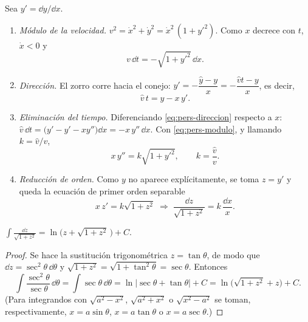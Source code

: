 \begin{desarrollo}
Sea $y'=\dd y/\dd x$.
\begin{enumerate}[label=\textbf{\arabic*.}, leftmargin=1.6em]
  \item \emph{Módulo de la velocidad.} $v^2=\dot x^2+\dot y^2=\dot x^2\,(1+y'^2)$. Como $x$ decrece con $t$, $\dot x<0$ y
  \begin{equation}
    v\,\dd t=-\sqrt{1+y'^2}\,\dd x .
    \label{eq:pers-modulo}
  \end{equation}
  \item \emph{Dirección.} El zorro corre hacia el conejo: $y'=-\dfrac{\hat y-y}{x}=-\dfrac{\hat vt-y}{x}$, es decir,
  \begin{equation}
    \hat v\,t=y-x\,y' .
    \label{eq:pers-direccion}
  \end{equation}
  \item \emph{Eliminación del tiempo.} Diferenciando \eqref{eq:pers-direccion} respecto a $x$: $\hat v\,\dd t=\bigl(y'-y'-xy''\bigr)\dd x=-x\,y''\,\dd x$. Con \eqref{eq:pers-modulo}, y llamando $k=\hat v/v$,
  \begin{equation}
    x\,y''=k\sqrt{1+y'^2},\qquad k=\frac{\hat v}{v}.
    \label{eq:pers-ode}
  \end{equation}
  \item \emph{Reducción de orden.} Como $y$ no aparece explícitamente, se toma $z=y'$ y queda la ecuación de primer orden separable
  \[
    x\,z'=k\sqrt{1+z^2}\;\Longrightarrow\;\frac{\dd z}{\sqrt{1+z^2}}=k\,\frac{\dd x}{x}.
  \]
\end{enumerate}
\end{desarrollo}

\begin{lemma}\label{lem:arsinh}
$\displaystyle\int\frac{\dd z}{\sqrt{1+z^2}}=\ln\bigl(z+\sqrt{1+z^2}\,\bigr)+C$.
\end{lemma}

\begin{proof}
Se hace la sustitución trigonométrica $z=\tan\theta$, de modo que $\dd z=\sec^2\theta\,\dd\theta$ y $\sqrt{1+z^2}=\sqrt{1+\tan^2\theta}=\sec\theta$. Entonces
\[
  \int\frac{\sec^2\theta}{\sec\theta}\,\dd\theta=\int\sec\theta\,\dd\theta=\ln\lvert\sec\theta+\tan\theta\rvert+C
  =\ln\bigl(\sqrt{1+z^2}+z\bigr)+C .
\]
(Para integrandos con $\sqrt{a^2-x^2}$, $\sqrt{a^2+x^2}$ o $\sqrt{x^2-a^2}$ se toman, respectivamente, $x=a\sin\theta$, $x=a\tan\theta$ o $x=a\sec\theta$.)
\end{proof}

